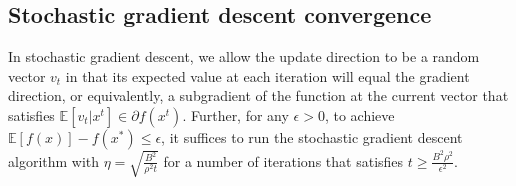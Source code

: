 \documentclass[../main.tex]{subfiles}
\begin{document}
\subsection{Stochastic gradient descent convergence}
In stochastic gradient descent, we allow the update direction to be a random vector $v_t$ in that its expected value at each iteration will equal the gradient direction, or equivalently, a subgradient of the function at the current vector that satisfies $\mathbb{E}[v_t|x^t]\in \partial f(x^t)$. Further, for any $\epsilon >0$, to achieve $\mathbb{E}[f(x)]-f(x^*)\leq \epsilon$, it suffices to run the stochastic gradient descent algorithm with $\eta=\sqrt{\frac{B^2}{\rho^2t}}$ for a number of iterations that satisfies $t\geq \frac{B^2\rho^2}{\epsilon^2}$.
\end{document}
